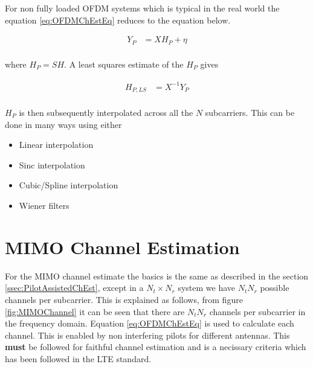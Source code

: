 For non fully loaded OFDM systems which is typical in the real world the equation \ref{eq:OFDMChEstEq} reduces to the equation below.

\begin{equation}\label{eq:ReducedRankOFDMChEstEq}
    \begin{aligned}
        Y_P & = XH_P + \eta \\
    \end{aligned}
\end{equation}

{where } $H_P = SH$. A least squares estimate of the $H_P$ gives 

\begin{equation}\label{eq:ReducedRankOFDMChEstEq}
    \begin{aligned}
        \hat{H_{P,LS}} & = X^{-1}Y_P \\
    \end{aligned}
\end{equation}

$H_P$ is then subsequently interpolated across all the $N$ subcarriers. This can be done in many ways using either
\begin{itemize}
    \item Linear interpolation
    \item Sinc interpolation
    \item Cubic/Spline interpolation
    \item Wiener filters
\end{itemize}

\section{MIMO Channel Estimation}\label{sec:MIMO}

For the MIMO channel estimate the basics is the same as described in the section \ref{ssec:PilotAssistedChEst}, except in a $N_t{\times}N_r$ system we have $N_tN_r$ possible channels per subcarrier. This is explained as follows, from figure \ref{fig:MIMOChannel} it can be seen that there are $N_tN_r$ channels per subcarrier in the frequency domain. Equation \ref{eq:OFDMChEstEq} is used to calculate each channel. This is enabled by non interfering pilots for different antennas. This \textbf{must} be followed for faithful channel estimation and is a necissary criteria which has been followed in the LTE standard.

